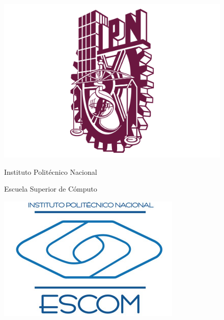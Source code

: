 \documentclass[12pt]{article}
\begin{document}
\begin{titlepage}

\begin{center}
\begin{figure}
\begin{minipage}{.22\textwidth}
  \centering
  \includegraphics[scale=0.05]{ipn.png}
\end{minipage}%
\begin{minipage}{.56\textwidth}
\begin{center}
\Large{Instituto Politécnico Nacional}\par
\vspace{7mm}
Escuela Superior de Cómputo
\end{center}
\end{minipage}%
\begin{minipage}{.22\textwidth}
  \centering
  \includegraphics[scale=0.5]{escom.jpg}
\end{minipage}
\end{figure}
\newcommand{\addfigure}[4]{
        \begin{figure}[htbp!]
            \begin{center}	

\end{center}
\end{figure}}
\end{center}
\end{titlepage}
\end{document}
